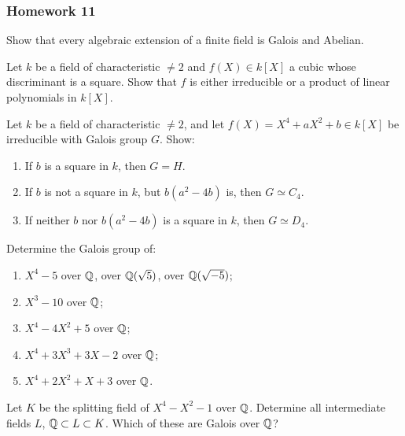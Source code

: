 \subsubsection{Homework 11}
\setcounter{exercise}{0}
\setcounter{equation}{0}

\begin{problem}
  Show that every algebraic extension of a finite field is Galois and
  Abelian.
\end{problem}
\begin{solution}
\end{solution}

\begin{problem}
  Let $k$ be a field of characteristic $\neq 2$ and $f(X)\in k[X]$ a
  cubic whose discriminant is a square. Show that $f$ is either irreducible
  or a product of linear polynomials in $k[X]$.
\end{problem}
\begin{solution}
\end{solution}

\begin{problem}
  Let $k$ be a field of characteristic $\neq 2$, and let
  $f(X)=X^4+aX^2+b\in k[X]$ be irreducible with Galois group $G$. Show:
  \begin{enumerate}[label=(\roman*),noitemsep]
  \item If $b$ is a square in $k$, then $G=H$.
  \item If $b$ is not a square in $k$, but $b(a^2-4b)$ is, then
    $G\simeq C_4$.
  \item If neither $b$ nor $b(a^2-4b)$ is a square in $k$, then
    $G\simeq D_4$.
  \end{enumerate}
\end{problem}
\begin{solution}
\end{solution}

\begin{problem}
  Determine the Galois group of:
  \begin{enumerate}[label=(\alph*),noitemsep]
  \item $X^4-5$ over $\mathbb{Q}$, over $\mathbb{Q}(\sqrt{5})$, over $\mathbb{Q}(\sqrt{-5})$;
  \item $X^3-10$ over $\mathbb{Q}$;
  \item $X^4-4X^2+5$ over $\mathbb{Q}$;
  \item $X^4+3X^3+3X-2$ over $\mathbb{Q}$;
  \item $X^4+2X^2+X+3$ over $\mathbb{Q}$.
  \end{enumerate}
\end{problem}
\begin{solution}
\end{solution}

\begin{problem}
  Let $K$ be the splitting field of $X^4-X^2-1$ over $\mathbb{Q}$. Determine
  all intermediate fields $L$, $\mathbb{Q}\subset L\subset K$. Which of
  these are Galois over $\mathbb{Q}$?
\end{problem}
\begin{solution}
\end{solution}

